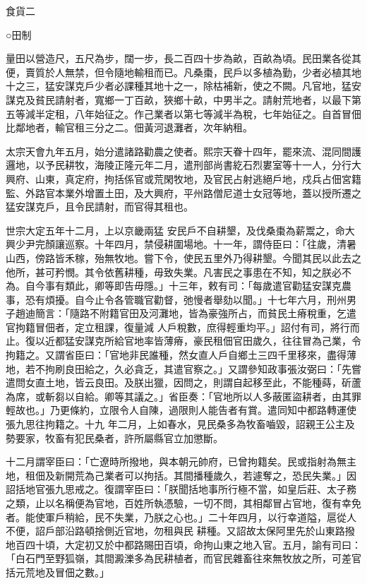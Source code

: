 
\begin{pinyinscope}

 食貨二



 ○田制



 量田以營造尺，五尺為步，闊一步，長二百四十步為畝，百畝為頃。民田業各從其便，賣質於人無禁，但令隨地輸租而已。凡桑棗，民戶以多植為勤，少者必植其地十之三，猛安謀克戶少者必課種其地十之一，除枯補新，使之不闕。凡官地，猛安謀克及貧民請射者，寬鄉一丁百畝，狹鄉十畝，中男半之。請射荒地者，以最下第
 五等減半定租，八年始征之。作己業者以第七等減半為稅，七年始征之。自首冒佃比鄰地者，輸官租三分之二。佃黃河退灘者，次年納租。



 太宗天會九年五月，始分遣諸路勸農之使者。熙宗天眷十四年，罷來流、混同間護邏地，以予民耕牧，海陵正隆元年二月，遣刑部尚書紇石烈婁室等十一人，分行大興府、山東，真定府，拘括係官或荒閑牧地，及官民占射逃絕戶地，戍兵占佃宮籍監、外路官本業外增置土田，及大興府，平州路僧尼道士女冠等地，蓋以授所遷之猛安謀克戶，且令民請射，而官得其租也。



 世宗大定五年十二月，上以京畿兩猛
 安民戶不自耕墾，及伐桑棗為薪鬻之，命大興少尹完顏讓巡察。十年四月，禁侵耕圍場地。十一年，謂侍臣曰：「往歲，清暑山西，傍路皆禾稼，殆無牧地。嘗下令，使民五里外乃得耕墾。今聞其民以此去之他所，甚可矜憫。其令依舊耕種，毋致失業。凡害民之事患在不知，知之朕必不為。自今事有類此，卿等即告毋隱。」十三年，敕有司：「每歲遣官勸猛安謀克農事，恐有煩擾。自今止令各管職官勸督，弛慢者舉劾以聞。」十七年六月，刑州男子趙迪簡言：「隨路不附籍官田及河灘地，皆為豪強所占，而貧民土瘠稅重，乞遣官拘籍冒佃者，定立租課，復量減
 人戶稅數，庶得輕重均平。」詔付有司，將行而止。復以近都猛安謀克所給官地率皆薄瘠，豪民租佃官田歲久，往往冒為己業，令拘籍之。又謂省臣曰：「官地非民誰種，然女直人戶自鄉土三四千里移來，盡得薄地，若不拘刷良田給之，久必貪乏，其遣官察之。」又謂參知政事張汝弼曰：「先嘗遣問女直土地，皆云良田。及朕出獵，因問之，則謂自起移至此，不能種蒔，斫蘆為席，或斬芻以自給。卿等其議之。」省臣奏：「官地所以人多蔽匿盜耕者，由其罪輕故也。」乃更條約，立限令人自陳，過限則人能告者有賞。遣同知中都路轉運使張九思往拘籍之。十九
 年二月，上如春水，見民桑多為牧畜嚙毀，詔親王公主及勢要家，牧畜有犯民桑者，許所屬縣官立加懲斷。



 十二月謂宰臣曰：「亡遼時所撥地，與本朝元帥府，已曾拘籍矣。民或指射為無主地，租佃及新開荒為己業者可以拘括。其間播種歲久，若遽奪之，恐民失業。」因詔括地官張九思戒之。復謂宰臣曰：「朕聞括地事所行極不當，如皇后莊、太子務之類，止以名稱便為官地，百姓所執憑驗，一切不問，其相鄰冒占官地，復有幸免者。能使軍戶稍給，民不失業，乃朕之心也。」二十年四月，以行幸道隘，扈從人不便，詔戶部沿路頓捨側近官地，勿租與民
 耕種。又詔故太保阿里先於山東路撥地百四十頃，大定初又於中都路賜田百頃，命拘山東之地入官。五月，諭有司曰：「白石門至野狐嶺，其間澱濼多為民耕植者，而官民雜畜往來無牧放之所，可差官括元荒地及冒佃之數。」




\end{pinyinscope}

